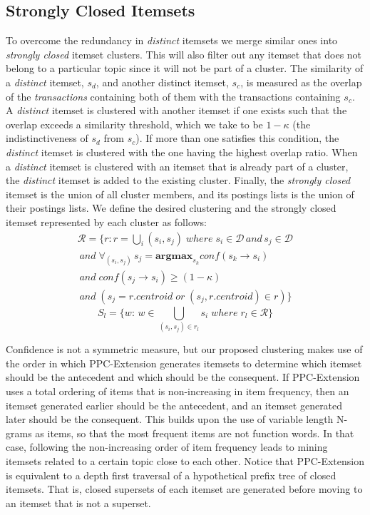 \documentclass{sig-alternate}
\begin{document}
\subsection{Strongly Closed Itemsets}
To overcome the redundancy in \emph{distinct} itemsets 
we merge similar ones
into \emph{strongly closed} itemset clusters.
This will also filter out any itemset 
that does not belong to a particular topic
since it will not be part of a cluster.
The similarity of a \emph{distinct} itemset,
$s_d$, and another distinct itemset, $s_c$,
is measured as the overlap of the \emph{transactions} containing both of them
with the transactions containing $s_c$. 
A \emph{distinct} itemset is clustered with another itemset if one exists
such that the overlap exceeds a similarity threshold,
which we take to be $1-\kappa$ (the indistinctiveness of $s_d$ from $s_c$).
If more than one satisfies this condition,
the  \emph{distinct} itemset is clustered with the 
one having the highest overlap ratio.
When  a \emph{distinct} itemset is clustered with an itemset that is already
part of a cluster, the \emph{distinct} itemset is added to the existing cluster.
Finally, the \emph{strongly closed} itemset is the union of all cluster members,
and its postings lists is the union of their postings lists.
We define the  desired clustering  and the strongly closed itemset
represented by each cluster as follows:
\begin{align*}\label{eq:strongClosedFormal}
\mathcal{R} = \{r: r = \bigcup_i{(s_i, s_j)}\; where\; s_i \in \mathcal{D} \, and \, s_j \in \mathcal{D} 
\\\,and\; \forall_{(s_i,s_j)} \, s_j = \textbf{argmax}_{s_k} conf(s_k \rightarrow s_i) \\\,and \;conf(s_j \rightarrow s_i) \ge (1-\kappa)
\\\, and\;( s_j = r.centroid\; or \; (s_j, r.centroid) \in r )\}
\end{align*}
\begin{equation}S_l = \{w:\, w \in \bigcup_{(s_i, s_j) \in r_l}{s_i} \; where \; r_l \in \mathcal{R}\}\end{equation}

Confidence is not a symmetric measure,
but our proposed clustering makes use of the order
in which PPC-Extension generates itemsets 
to determine which itemset should be the antecedent 
and which should be the consequent.
If PPC-Extension uses a total ordering 
of items that is non-increasing in item frequency,
then 
an itemset generated earlier 
should be the antecedent, and
an itemset generated later
should be the consequent.
This builds upon the use of
variable length N-grams
as items,
so that the most frequent items
are not function words.
In that case, following the non-increasing order 
of item frequency leads to mining itemsets related 
to a certain topic close to each other.
Notice that PPC-Extension is equivalent to a depth first traversal 
of a hypothetical prefix tree of closed itemsets.
That is, closed supersets of each itemset are generated before 
moving to an itemset that is not a superset. 
\end{document}
